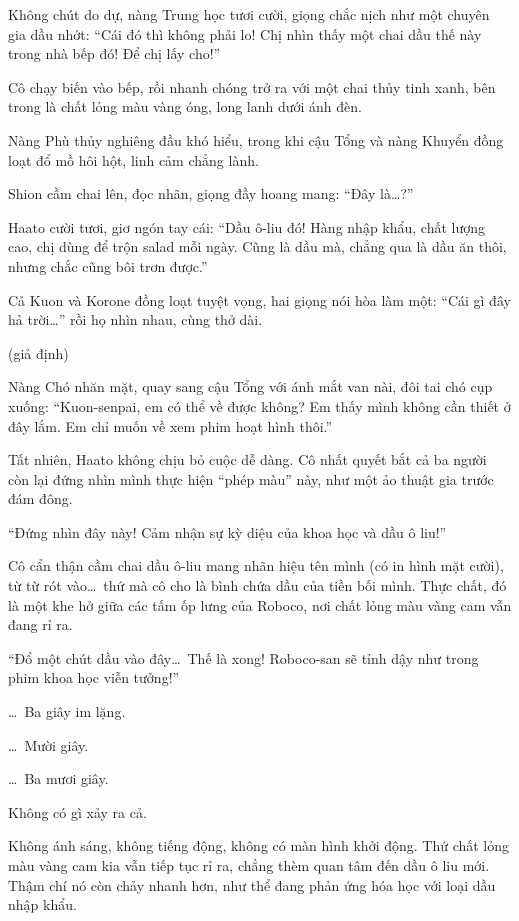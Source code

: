 \documentclass[../main.tex]{subfiles}
\begin{document}
Không chút do dự, nàng Trung học tươi cười, giọng chắc nịch như một chuyên gia dầu nhớt: ``Cái đó thì không phải lo! Chị nhìn thấy một chai dầu thế này trong nhà bếp đó! Để chị lấy cho!''

Cô chạy biến vào bếp, rồi nhanh chóng trở ra với một chai thủy tinh xanh, bên trong là chất lỏng màu vàng óng, long lanh dưới ánh đèn.

Nàng Phù thủy nghiêng đầu khó hiểu, trong khi cậu Tổng và nàng Khuyển đồng loạt đổ mồ hôi hột, linh cảm chẳng lành.

Shion cầm chai lên, đọc nhãn, giọng đầy hoang mang: ``Đây là\dots?''

Haato cười tươi, giơ ngón tay cái: ``Dầu ô-liu đó! Hàng nhập khẩu, chất lượng cao, chị dùng để trộn salad mỗi ngày. Cũng là dầu mà, chẳng qua là dầu ăn thôi, nhưng chắc cũng bôi trơn được.''

Cả Kuon và Korone đồng loạt tuyệt vọng, hai giọng nói hòa làm một: ``Cái gì đây hả trời\dots''  rồi họ nhìn nhau, cùng thở dài.

 (giả định)

Nàng Chó nhăn mặt, quay sang cậu Tổng với ánh mắt van nài, đôi tai chó cụp xuống: ``Kuon-senpai, em có thể về được không? Em thấy mình không cần thiết ở đây lắm. Em chỉ muốn về xem phim hoạt hình thôi.''

Tất nhiên, Haato không chịu bỏ cuộc dễ dàng. Cô nhất quyết bắt cả ba người còn lại đứng nhìn mình thực hiện ``phép màu'' này, như một ảo thuật gia trước đám đông.

``Đứng nhìn đây này! Cảm nhận sự kỳ diệu của khoa học và dầu ô liu!''

Cô cẩn thận cầm chai dầu ô-liu mang nhãn hiệu tên mình (có in hình mặt cười), từ từ rót vào\dots\ thứ mà cô cho là bình chứa dầu của tiền bối mình. Thực chất, đó là một khe hở giữa các tấm ốp lưng của Roboco, nơi chất lỏng màu vàng cam vẫn đang rỉ ra.

``Đổ một chút dầu vào đây\dots\ Thế là xong! Roboco-san sẽ tỉnh dậy như trong phim khoa học viễn tưởng!''


\dots\ Ba giây im lặng.

\dots\ Mười giây.

\dots\ Ba mươi giây.

Không có gì xảy ra cả.

Không ánh sáng, không tiếng động, không có màn hình khởi động. Thứ chất lỏng màu vàng cam kia vẫn tiếp tục rỉ ra, chẳng thèm quan tâm đến dầu ô liu mới. Thậm chí nó còn chảy nhanh hơn, như thể đang phản ứng hóa học với loại dầu nhập khẩu.
\end{document}
